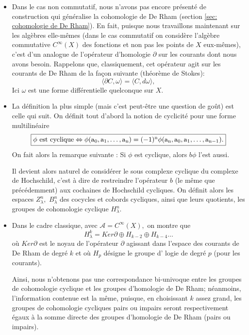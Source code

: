 \begin{itemize}
	\item  Dans le cas non commutatif, nous n'avons pas encore pr\'esent\'e 
	de construction qui g\'en\'eralise la cohomologie de De Rham 
	(section \ref{sec: cohomologie de De Rham}). 
	 En fait, puisque nous travaillons maintenant sur les alg\`ebres 
	elle-m\^emes (dans le cas commutatif on consid\`ere l'alg\`ebre 
	commutative $C^\infty(X)$ des fonctions et non pas les points de $X$ 
	eux-m\^emes), 
	c'est d'un analogue de l'op\'erateur d'homologie $  \partial $ sur les courants dont nous avons besoin.
	 Rappelons que, classiquement, cet op\'erateur agit sur les courants de De 
	  Rham de la fa\c con suivante (th\'eor\`eme de Stokes): 
	  $$  \langle \partial C, \omega \rangle  = \langle C, d\omega \rangle  ,$$
	  Ici $  \omega$ est une forme diff\'erentielle quelconque sur $X$.
	  
	  \item 
La d\'efinition la plus simple  (mais c'est peut-\^etre une question de go\^ut) est 
celle qui suit.
On d\'efinit tout d'abord la notion de cyclicit\'e pour une forme 
multilin\'eaire  $$ 
\mbox{\fbox{$  
\phi \rm{\ est \ cyclique} \Leftrightarrow \phi(a_0,a_1,\ldots,a_n)=(-1)^n
\phi(a_n,a_0,a_1,\ldots,a_{n-1}).
$}} $$    
On fait alors la remarque suivante \cite{ConnesIHES} :
Si  $  \phi $  est cyclique, alors  $  b \phi $ l'est aussi. \par 
Il devient alors naturel de consid\'erer le sous complexe cyclique du 
complexe de Hochschild, c'est \`a dire de restreindre l'op\'erateur $b$ 
(le m\^eme que pr\'ec\'edemment) aux cochaines de Hochschild cycliques.
On d\'efinit alors les espaces $  Z_\lambda^n ,$  $  B_\lambda^n $  des 
cocycles et cobords cycliques, ainsi que leurs quotients, les groupes 
de cohomologie cyclique $ H_\lambda^n .$ \par 

\item
Dans le cadre classique, \ie  avec  $ {\mathcal
A}=C^\infty(X) ,$ on montre \cite{ConnesIHES}
que  $$H_\lambda^k= Ker \partial \oplus H_{k-2}
\oplus H_{k-4} \ldots  $$     o\`u
 $ Ker \partial $   est le noyau de l'op\'erateur $  \partial $  
 agissant dans l'espace des courants de De Rham de degr\'e $k$ et o\`u  $  
 H_p $   d\'esigne le groupe d' logie
de degr\'e $  p $   (pour les courants). 

Ainsi, nous n'obtenons pas une correspondance bi-univoque entre les 
groupes de cohomologie cyclique et les groupes d'homologie de De 
Rham; n\'eanmoins, l'information contenue est la m\^eme, puisque, 
en choisissant $k$ assez grand, les groupes de cohomologie cycliques 
pairs ou impairs seront respectivement \'egaux \`a la somme directe des 
groupes d'homologie de De Rham (pairs ou impairs). \par 
 

\end{itemize}
